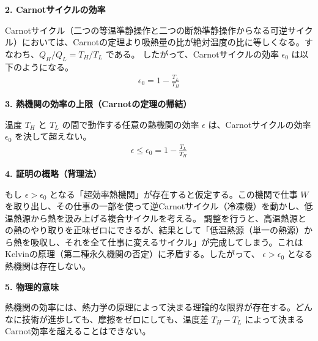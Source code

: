 \documentclass[a4paper,12pt]{jlreq}
\begin{document}
\textbf{2. Carnotサイクルの効率} \par
Carnotサイクル（二つの等温準静操作と二つの断熱準静操作からなる可逆サイクル）においては、Carnotの定理より吸熱量の比が絶対温度の比に等しくなる。すなわち、$Q_H / Q_L = T_H / T_L$ である。
したがって、Carnotサイクルの効率 $\epsilon_0$ は以下のようになる。
\begin{align}
  \epsilon_0 = 1 - \frac{T_L}{T_H}
\end{align}

\textbf{3. 熱機関の効率の上限（Carnotの定理の帰結）} \par
温度 $T_H$ と $T_L$ の間で動作する任意の熱機関の効率 $\epsilon$ は、Carnotサイクルの効率 $\epsilon_0$ を決して超えない。
\begin{align}
  \epsilon \le \epsilon_0 = 1 - \frac{T_L}{T_H}
\end{align}

\textbf{4. 証明の概略（背理法）} \par
もし $\epsilon > \epsilon_0$ となる「超効率熱機関」が存在すると仮定する。この機関で仕事 $W$ を取り出し、その仕事の一部を使って逆Carnotサイクル（冷凍機）を動かし、低温熱源から熱を汲み上げる複合サイクルを考える。
調整を行うと、高温熱源との熱のやり取りを正味ゼロにできるが、結果として「低温熱源（単一の熱源）から熱を吸収し、それを全て仕事に変えるサイクル」が完成してしまう。これはKelvinの原理（第二種永久機関の否定）に矛盾する。したがって、 $\epsilon > \epsilon_0$ となる熱機関は存在しない。

\textbf{5. 物理的意味} \par
熱機関の効率には、熱力学の原理によって決まる理論的な限界が存在する。どんなに技術が進歩しても、摩擦をゼロにしても、温度差 $T_H - T_L$ によって決まるCarnot効率を超えることはできない。
\end{document}
